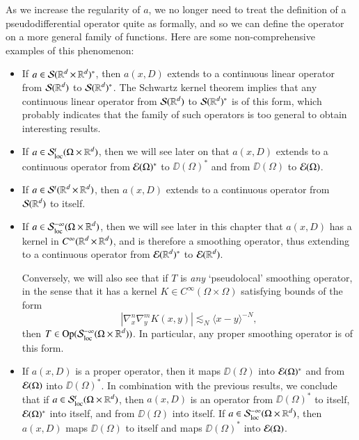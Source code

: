 As we increase the regularity of $a$, we no longer need to treat the definition of a pseudodifferential operator quite as formally, and so we can define the operator on a more general family of functions. Here are some non-comprehensive examples of this phenomenon:
%
\begin{itemize}
    \item If $a \in \mathcal{S}(\operatorname{\mathbb{R}}^d \times \operatorname{\mathbb{R}}^d)^*$, then $a(x,D)$ extends to a continuous linear operator from $\mathcal{S}(\operatorname{\mathbb{R}}^d)$ to $\mathcal{S}(\operatorname{\mathbb{R}}^d)^*$. The Schwartz kernel theorem implies that any continuous linear operator from $\mathcal{S}(\operatorname{\mathbb{R}}^d)$ to $\mathcal{S}(\operatorname{\mathbb{R}}^d)^*$ is of this form, which probably indicates that the family of such operators is too general to obtain interesting results.

    \item If $a \in \mathcal{S}^t_{\text{loc}}(\Omega \times \operatorname{\mathbb{R}}^d)$, then we will see later on that $a(x,D)$ extends to a continuous operator from $\operatorname{\mathcal{E}}(\Omega)^*$ to $\DD(\Omega)^*$ and from $\DD(\Omega)$ to $\operatorname{\mathcal{E}}(\Omega)$.

    \item If $a \in \mathcal{S}^t(\operatorname{\mathbb{R}}^d \times \operatorname{\mathbb{R}}^d)$, then $a(x,D)$ extends to a continuous operator from $\operatorname{\mathcal{S}}(\operatorname{\mathbb{R}}^d)$ to itself.

    \item If $a \in \mathcal{S}^{-\infty}_{\text{loc}}(\Omega \times \operatorname{\mathbb{R}}^d)$, then we will see later in this chapter that $a(x,D)$ has a kernel in $C^\infty(\operatorname{\mathbb{R}}^d \times \operatorname{\mathbb{R}}^d)$, and is therefore a smoothing operator, thus extending to a continuous operator from $\operatorname{\mathcal{E}}(\operatorname{\mathbb{R}}^d)^*$ to $\operatorname{\mathcal{E}}(\operatorname{\mathbb{R}}^d)$.

    Conversely, we will also see that if $T$ is \emph{any} `pseudolocal' smoothing operator, in the sense that it has a kernel $K \in C^\infty(\Omega \times \Omega)$ satisfying bounds of the form
    \[ |\nabla^n_x \nabla^m_y K(x,y)| \lesssim_N \langle x - y \rangle^{-N}, \]
    then $T \in \text{Op}(\mathcal{S}^{-\infty}_{\text{loc}}(\Omega \times \operatorname{\mathbb{R}}^d))$. In particular, any proper smoothing operator is of this form.

    \item If $a(x,D)$ is a proper operator, then it maps $\DD(\Omega)$ into $\operatorname{\mathcal{E}}(\Omega)^*$ and from $\operatorname{\mathcal{E}}(\Omega)$ into $\DD(\Omega)^*$. In combination with the previous results, we conclude that if $a \in \mathcal{S}^t_{\text{loc}}(\Omega \times \operatorname{\mathbb{R}}^d)$, then $a(x,D)$ is an operator from $\DD(\Omega)^*$ to itself, $\operatorname{\mathcal{E}}(\Omega)^*$ into itself, and from $\DD(\Omega)$ into itself. If $a \in \mathcal{S}^{-\infty}_{\text{loc}}(\Omega \times \operatorname{\mathbb{R}}^d)$, then $a(x,D)$ maps $\DD(\Omega)$ to itself and maps $\DD(\Omega)^*$ into $\operatorname{\mathcal{E}}(\Omega)$.


\end{itemize}
